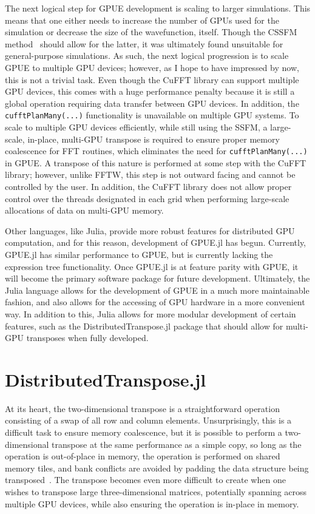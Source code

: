 The next logical step for GPUE development is scaling to larger simulations.
This means that one either needs to increase the number of GPUs used for the simulation or decrease the size of the wavefunction, itself.
Though the CSSFM method~\cite{bayindir2015} should allow for the latter, it was ultimately found unsuitable for general-purpose simulations.
As such, the next logical progression is to scale GPUE to multiple GPU devices; however, as I hope to have impressed by now, this is not a trivial task.
Even though the CuFFT library can support multiple GPU devices, this comes with a huge performance penalty because it is still a global operation requiring data transfer between GPU devices.
In addition, the \texttt{cufftPlanMany(...)} functionality is unavailable on multiple GPU systems.
To scale to multiple GPU devices efficiently, while still using the SSFM, a large-scale, in-place, multi-GPU transpose is required to ensure proper memory coalescence for FFT routines, which eliminates the need for \texttt{cufftPlanMany(...)} in GPUE.
A transpose of this nature is performed at some step with the CuFFT library; however, unlike FFTW, this step is not outward facing and cannot be controlled by the user.
In addition, the CuFFT library does not allow proper control over the threads designated in each grid when performing large-scale allocations of data on multi-GPU memory.

Other languages, like Julia, provide more robust features for distributed GPU computation, and 
for this reason, development of GPUE.jl has begun.
Currently, GPUE.jl has similar performance to GPUE, but is currently lacking the expression tree functionality.
Once GPUE.jl is at feature parity with GPUE, it will become the primary software package for future development.
Ultimately, the Julia language allows for the development of GPUE in a much more maintainable fashion, and also allows for the accessing of GPU hardware in a more convenient way.
In addition to this, Julia allows for more modular development of certain features, such as the DistributedTranspose.jl package that should allow for multi-GPU transposes when fully developed.

\section{DistributedTranspose.jl}
\label{sec:DT}

At its heart, the two-dimensional transpose is a straightforward operation consisting of a swap of all row and column elements.
Unsurprisingly, this is a difficult task to ensure memory coalescence, but
it is possible to perform a two-dimensional transpose at the same performance as a simple copy, so long as the operation is out-of-place in memory, the operation is performed on shared memory tiles, and bank conflicts are avoided by padding the data structure being transposed~\cite{harris2013}.
The transpose becomes even more difficult to create when one wishes to transpose large three-dimensional matrices, potentially spanning across multiple GPU devices, while also ensuring the operation is in-place in memory.

